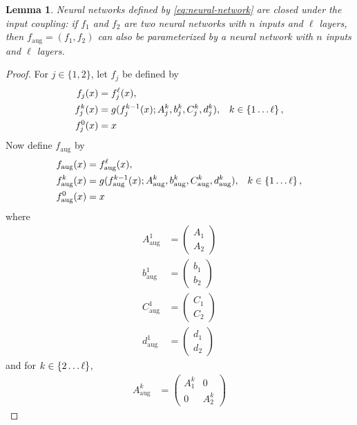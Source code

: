 \documentclass[oneside, article]{memoir}
\newtheorem{lemma}{Lemma}
\begin{document}
\begin{lemma}
  \label{lem:augmentation}
  Neural networks defined by \eqref{eq:neural-network} are closed under the input coupling:
  if \(f_1\) and \(f_2\) are two neural networks with \(n\) inputs and \(\ell\) layers, then \(f_\text{aug} = (f_1, f_2)\) can also be parameterized by a neural network with \(n\) inputs and \(\ell\) layers.
\end{lemma}
\begin{proof}
  For \(j \in \{1, 2\}\), let \(f_j\) be defined by
  \begin{align}
    f_j(x) &= f_j^\ell(x), \\
    f_j^k(x) &= g(f_j^{k-1}(x); A_j^k, b_j^k, C_j^k, d_j^k), & k \in \cbr{1 \ldots \ell},
    \\
    f_j^0(x) &= x
  \end{align}
  Now define \(f_\text{aug}\) by
  \begin{align}
    f_\text{aug}(x) &= f_\text{aug}^\ell(x), \\
    f_\text{aug}^k(x) &= g(f_\text{aug}^{k-1}(x); A_\text{aug}^k, b_\text{aug}^k, C_\text{aug}^k, d_\text{aug}^k), & k \in \cbr{1 \ldots \ell},
    \\
    f_\text{aug}^0(x) &= x
  \end{align}
  where
  \begin{align}
    A_\text{aug}^1 &= \begin{pmatrix}
      A_1 \\ A_2 
    \end{pmatrix}
    \\
    b_\text{aug}^1 &= \begin{pmatrix}
      b_1 \\ b_2
    \end{pmatrix}
    \\
    C_\text{aug}^1 &= \begin{pmatrix}
      C_1 \\ C_2
    \end{pmatrix}
    \\
    d_\text{aug}^1 &= \begin{pmatrix}
      d_1 \\ d_2
    \end{pmatrix}
  \end{align}
  and for \(k \in \cbr{2 \ldots \ell}\),
  \begin{align}
    A_\text{aug}^k &= \begin{pmatrix}
      A_1^k & 0 \\
      0 & A_2^k

\end{pmatrix}
\end{align}
\end{proof}
\end{document}
